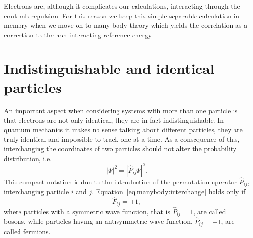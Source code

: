 Electrons are, although it complicates our calculations, interacting through the coulomb repulsion. 
For this reason we keep this simple separable calculation in memory when we move on to many-body theory which yields the correlation as a correction to the non-interacting reference energy.


\section{Indistinguishable and identical particles}
An important aspect when considering systems with more than one particle is that electrons are not only identical, they are in fact indistinguishable.
In quantum mechanics it makes no sense talking about different particles, they are truly identical and impossible to track one at a time.
As a consequence of this, interchanging the coordinates of two particles should not alter the probability distribution, i.e.
\begin{equation}
\label{eq:manybody:interchange}
| \Psi |^2
=
|\hat{P}_{ij} \Psi |^2 .
\end{equation}
This compact notation is due to the introduction of the permutation operator $\hat{P}_{ij}$, interchanging particle $i$ and $j$. Equation~\eqref{eq:manybody:interchange} holds only if
\begin{equation}
\hat{P}_{ij} = \pm 1 ,
\end{equation}
where particles with a symmetric wave function, that is $\hat{P}_{ij} = 1$, are called bosons, while particles having an antisymmetric wave function, $\hat{P}_{ij} = -1$, are called fermions.


